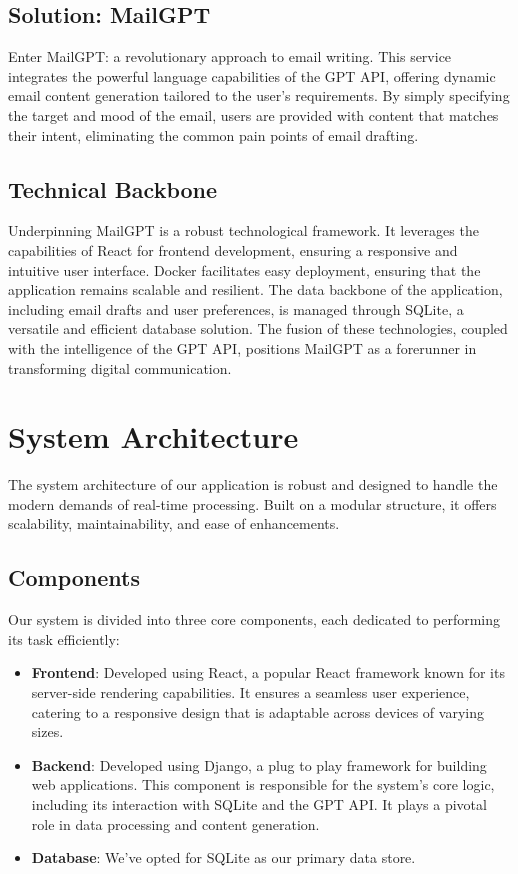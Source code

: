 \documentclass[12pt]{article}
\begin{document}
\subsection{Solution: MailGPT}

Enter MailGPT: a revolutionary approach to email writing. This service integrates the powerful language capabilities of the GPT API, offering dynamic email content generation tailored to the user's requirements. By simply specifying the target and mood of the email, users are provided with content that matches their intent, eliminating the common pain points of email drafting.

\subsection{Technical Backbone}

Underpinning MailGPT is a robust technological framework. It leverages the capabilities of React for frontend development, ensuring a responsive and intuitive user interface. Docker facilitates easy deployment, ensuring that the application remains scalable and resilient. The data backbone of the application, including email drafts and user preferences, is managed through SQLite, a versatile and efficient database solution. The fusion of these technologies, coupled with the intelligence of the GPT API, positions MailGPT as a forerunner in transforming digital communication.


\section{System Architecture}

The system architecture of our application is robust and designed to handle the modern demands of real-time processing. Built on a modular structure, it offers scalability, maintainability, and ease of enhancements.

\subsection{Components}
Our system is divided into three core components, each dedicated to performing its task efficiently:
\begin{itemize}
	\item \textbf{Frontend}: Developed using React, a popular React framework known for its server-side rendering capabilities. It ensures a seamless user experience, catering to a responsive design that is adaptable across devices of varying sizes.
	      	          
	\item \textbf{Backend}: Developed using Django, a plug to play framework for building web applications. This component is responsible for the system's core logic, including its interaction with SQLite and the GPT API. It plays a pivotal role in data processing and content generation.
	      	          
	\item \textbf{Database}: We've opted for SQLite as our primary data store. 
\end{itemize}
\end{document}
